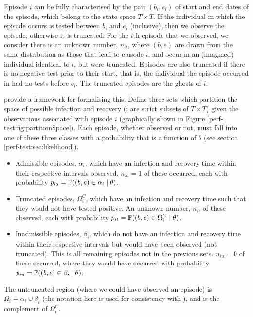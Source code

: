 \documentclass[thesis.tex]{subfiles}
\begin{document}
Episode $i$ can be fully characterised by the pair $(b_i, e_i)$ of
start and end dates of the episode, which belong to the state space
$T \times T$. If the individual in which the episode occurs is tested
between $b_i$ and $e_i$ (inclusive), then we observe the episode,
otherwise it is truncated. For the $i$th episode that we observed, we
consider there is an unknown number, $n_{it}$, where $(b, e)$ are
drawn from the same distribution as those that lead to episode $i$,
and occur in an (imagined) individual identical to $i$, but were
truncated. Episodes are also truncated if there is no negative test
prior to their start, that is, the individual the episode occurred in
had no tests before $b_i$. The truncated episodes are the ghosts of $i$.

\Textcite{heiseyModelling} provide a framework for formalising this.
Define three sets which partition the space of possible infection and
recovery (\ie: are strict subsets of $T \times T$) given the
observations associated with episode $i$ (graphically shown in Figure
\ref{perf-test:fig:partitionSpace}). Each episode, whether observed or not, must
fall into one of these three classes with a probability that is a
function of $\theta$ (see section \ref{perf-test:sec:likelihood}).

\begin{itemize}
\item
  Admissible episodes, $\alpha_i$, which have an infection and
  recovery time within their respective intervals observed.
  $n_{ia} =1$ of these occurred, each with probability
  $p_{ia} = \operatorname{\mathbb{P}}((b, e) \in \alpha_i \mid \theta)$.
\item
  Truncated episodes, $\Omega_i^C$, which have an infection and
  recovery time such that they would not have tested positive. An
  unknown number, $n_{it}$ of these observed, each with probability
  $p_{it} = \operatorname{\mathbb{P}}((b, e) \in \Omega^C_i \mid \theta)$.
\item
  Inadmissible episodes, $\beta_i$, which do not have an infection and
  recovery time within their respective intervals but would have been
  observed (not truncated). This is all remaining episodes not in the
  previous sets. $n_{iu} = 0$ of these occurred, where they would have
  occurred with probability
  $p_{iu} = \operatorname{\mathbb{P}}((b, e) \in \beta_i \mid \theta)$.
\end{itemize}

The untruncated region (where we could have observed an episode) is
$\Omega_i = \alpha_i \cup \beta_i$ (the notation here is used for
consistency with \textcite{heiseyModelling}), and is the
complement of $\Omega^C_i$.
\end{document}
